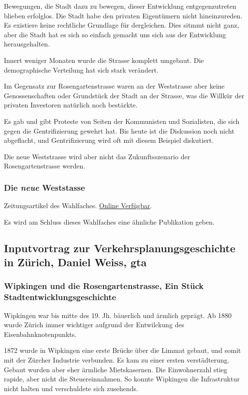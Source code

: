 \documentclass[a4paper,11pt,ngerman]{scrartcl}
\begin{document}
Bewegungen, die Stadt dazu zu bewegen, dieser Entwicklung entgegenzutreten
blieben erfolglos. Die Stadt habe den privaten Eigentümern nicht
hineinzureden. Es existiere keine rechtliche Grundlage für dergleichen. Dies
sitmmt nicht ganz, aber die Stadt hat es sich so einfach gemacht uns sich
aus der Entwicklung herausgehalten.

Innert weniger Monaten wurde die Strasse komplett umgebaut. Die
demographische Verteilung hat sich stark verändert.

Im Gegensatz zur Rosengartenstrasse waren an der Weststrasse aber keine
Genossenschaften oder Grundstück der Stadt an der Strasse, was die Willkür
der privaten Investoren natürlich noch bestärkte.

Es gab und gibt Proteste von Seiten der Kommunisten und Sozialisten, die
sich gegen die Gentrifizierung gewehrt hat. Bis heute ist die Diskussion
noch nicht abgeflacht, und Gentrifizierung wird oft mit diesem Beispiel
diskutiert.

Die neue Weststrasse wird aber nicht das Zukunftsszenario der
Rosengartenstrasse werden.

\subsubsection{Die \emph{neue} Weststasse}
\label{sec-2-1-3}

Zeitungsartikel des Wahlfaches. \href{http://www.soziologie.arch.ethz.ch/_DATA/90/FINAL_DieNeueWeststrasse_160517.pdf}{Online Verfügbar}.

Es wird am Schluss dieses Wahlfaches eine ähnliche Publikation geben.

\subsection{Inputvortrag zur Verkehrsplanungsgeschichte in Zürich, Daniel Weiss, gta}
\label{sec-2-2}

\subsubsection{Wipkingen und die Rosengartenstrasse, Ein Stück Stadtentwicklungsgeschichte}
\label{sec-2-2-1}

Wipkingen war bis mitte des 19. Jh. bäuerlich und ärmlich geprägt. Ab 1880
wurde Zürich immer wichtiger aufgrund der Entwilckung des
Eisenbahnknotenpunkts.

1872 wurde in Wipkingen eine erste Brücke über die Limmat gebaut, und somit
mit der Zürcher Industrie verbunden. Es kam zu einer ersten
verstädterung. Gebaut wurden aber eher ärmliche Mietskasernen. Die
Einwohnerzahl stieg rapide, aber nicht die Steuereinnahmen. So konnte
Wipkingen die Infrastruktur nicht halten und verschuldete sich
zusehends.
\end{document}

